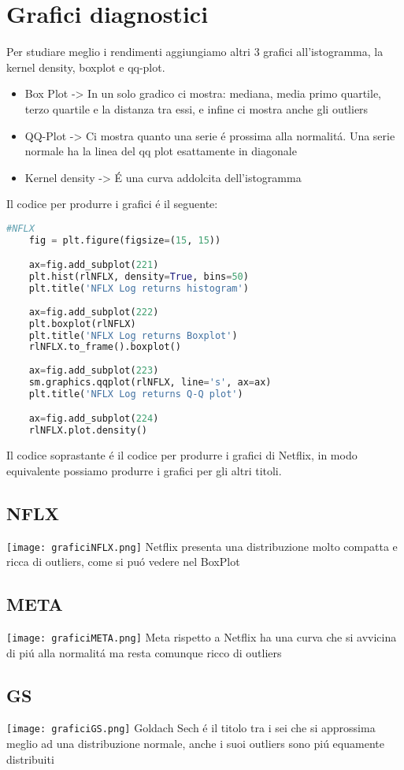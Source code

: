 \documentclass{report}
\begin{document}
\section{Grafici diagnostici}
Per studiare meglio i rendimenti aggiungiamo altri 3 grafici all'istogramma, la kernel density, boxplot e qq-plot.
\begin{itemize}[leftmargin=30pt, rightmargin=2cm]
\item Box Plot -> In un solo gradico ci mostra: mediana, media primo quartile, terzo quartile e la distanza tra essi, e infine ci mostra anche gli outliers
\item QQ-Plot -> Ci mostra quanto una serie é prossima alla normalitá. Una serie normale ha la linea del qq plot esattamente in diagonale
\item Kernel density -> É una curva addolcita dell'istogramma
\end{itemize}
Il codice per produrre i grafici é il seguente:
\begin{lstlisting}[language=python]
    #NFLX
    fig = plt.figure(figsize=(15, 15))

    ax=fig.add_subplot(221)
    plt.hist(rlNFLX, density=True, bins=50)
    plt.title('NFLX Log returns histogram')
    
    ax=fig.add_subplot(222)
    plt.boxplot(rlNFLX)
    plt.title('NFLX Log returns Boxplot')
    rlNFLX.to_frame().boxplot()
    
    ax=fig.add_subplot(223)
    sm.graphics.qqplot(rlNFLX, line='s', ax=ax)
    plt.title('NFLX Log returns Q-Q plot')

    ax=fig.add_subplot(224)
    rlNFLX.plot.density()
\end{lstlisting}
Il codice soprastante é il codice per produrre i grafici di Netflix, in modo equivalente possiamo produrre i grafici per gli altri titoli.
\subsection{NFLX}
\texttt{[image: graficiNFLX.png]}
Netflix presenta una distribuzione molto compatta e ricca di outliers, come si puó vedere nel BoxPlot
\subsection{META}
\texttt{[image: graficiMETA.png]}
Meta rispetto a Netflix ha una curva che si avvicina di piú alla normalitá ma resta comunque ricco di outliers
\subsection{GS}
\texttt{[image: graficiGS.png]}
Goldach Sech é il titolo tra i sei che si approssima meglio ad una distribuzione normale, anche i suoi outliers sono piú equamente distribuiti
\end{document}
